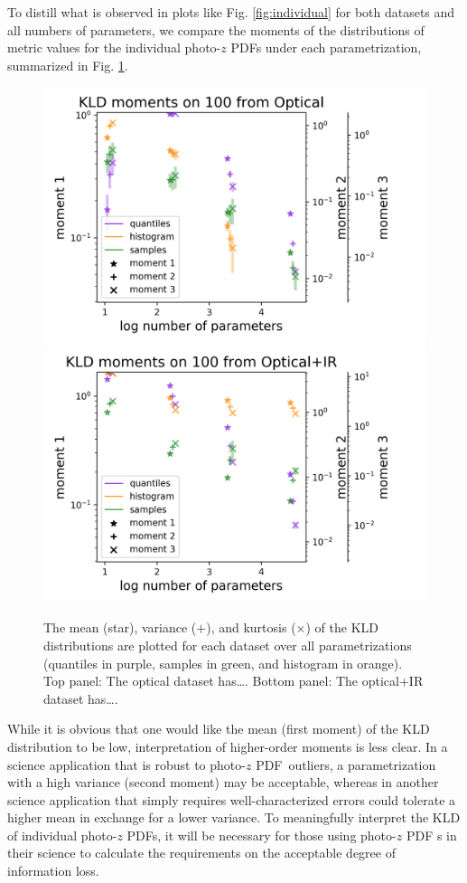 \documentclass[\docopts]{\docclass}
\newcommand{\pz}{photo-$z$ PDF}
\begin{document}
To distill what is observed in plots like Fig. \ref{fig:individual} for both 
datasets and all numbers of parameters, we compare the moments of the 
distributions of metric values for the individual \pz s under each 
parametrization, summarized in Fig. \ref{fig:moments}.

\begin{figure}
  \includegraphics[width=0.9\columnwidth]{lsst_moments.png}\\
  \includegraphics[width=0.9\columnwidth]{euclid_moments.png}
  \caption{The mean (star), variance ($+$), and kurtosis ($\times$) of the KLD 
distributions are plotted for each dataset over all parametrizations (quantiles 
in purple, samples in green, and histogram in orange).  Top panel: The optical 
dataset has\dots.  Bottom panel: The optical+IR dataset has\dots.
  \label{fig:moments}}
\end{figure}

While it is obvious that one would like the mean (first moment) of the KLD 
distribution to be low, interpretation of higher-order moments is less clear.  
In a science application that is robust to \pz\ outliers, a parametrization 
with a high variance (second moment) may be acceptable, whereas in another 
science application that simply requires well-characterized errors could 
tolerate a higher mean in exchange for a lower variance.  To meaningfully 
interpret the KLD of individual \pz s, it will be necessary for those using \pz 
s in their science to calculate the requirements on the acceptable degree of 
information loss.
\end{document}
